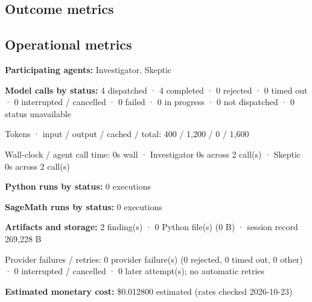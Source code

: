 \documentclass[11pt]{article}
\begin{document}
\subsection{Outcome metrics}
\subsection{Operational metrics}
\textbf{Participating agents:} Investigator, Skeptic\par
\textbf{Model calls by status:} 4 dispatched · 4 completed · 0 rejected · 0 timed out · 0 interrupted / cancelled · 0 failed · 0 in progress · 0 not dispatched · 0 status unavailable\par
Tokens · input / output / cached / total: 400 / 1,200 / 0 / 1,600\par
Wall-clock / agent call time: 0s wall · Investigator 0s across 2 call(s) · Skeptic 0s across 2 call(s)\par
\textbf{Python runs by status:} 0 executions\par
\textbf{SageMath runs by status:} 0 executions\par
\textbf{Artifacts and storage:} 2 finding(s) · 0 Python file(s) (0 B) · session record 269,228 B\par
Provider failures / retries: 0 provider failure(s) (0 rejected, 0 timed out, 0 other) · 0 interrupted / cancelled · 0 later attempt(s); no automatic retries\par
\textbf{Estimated monetary cost:} \$0.012800 estimated (rates checked 2026-10-23)\par
\end{document}
